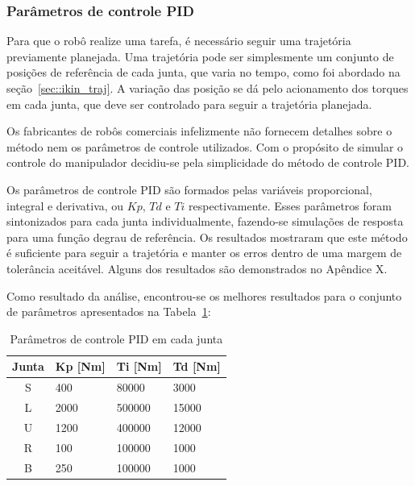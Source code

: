 \subsubsection{Parâmetros de controle PID}

Para que o robô realize uma tarefa, é necessário seguir uma trajetória
previamente planejada. Uma trajetória pode ser simplesmente um conjunto de
posições de referência de cada junta, que varia no tempo, como foi abordado na
seção~\ref{sec::ikin_traj}. A variação das posição se dá pelo acionamento dos
torques em cada junta, que deve ser controlado para seguir a trajetória
planejada. 

Os fabricantes de robôs comerciais infelizmente não fornecem detalhes sobre o
método nem os parâmetros de controle utilizados.
Com o propósito de simular o controle do manipulador decidiu-se pela
simplicidade do método de controle PID.

Os parâmetros de controle PID são formados pelas variáveis proporcional,
integral e derivativa, ou $Kp$, $Td$ e $Ti$ respectivamente. Esses parâmetros
foram sintonizados para cada junta individualmente, fazendo-se simulações de
resposta para uma função degrau de referência. Os resultados mostraram que este
método é suficiente para seguir a trajetória e manter os erros dentro de uma
margem de tolerância aceitável. Alguns dos resultados são demonstrados no
Apêndice X.

Como resultado da análise, encontrou-se os melhores resultados
para o conjunto de parâmetros apresentados na
Tabela~\ref{tab::pid}:
%
\begin{table}[h]
\centering
\caption{Parâmetros de controle PID em cada junta}
\label{tab::pid}
\begin{tabular}{@{}clll@{}}
\toprule
\textbf{Junta} & \textbf{Kp [Nm]} & \textbf{Ti [Nm]} & \textbf{Td [Nm]} \\ \midrule 
S              & 400         & 80000       & 3000        \\
L              & 2000        & 500000      & 15000       \\
U              & 1200        & 400000      & 12000       \\
R              & 100         & 100000      & 1000        \\
B              & 250         & 100000      & 1000        \\ \bottomrule
\end{tabular}
\end{table}
%

